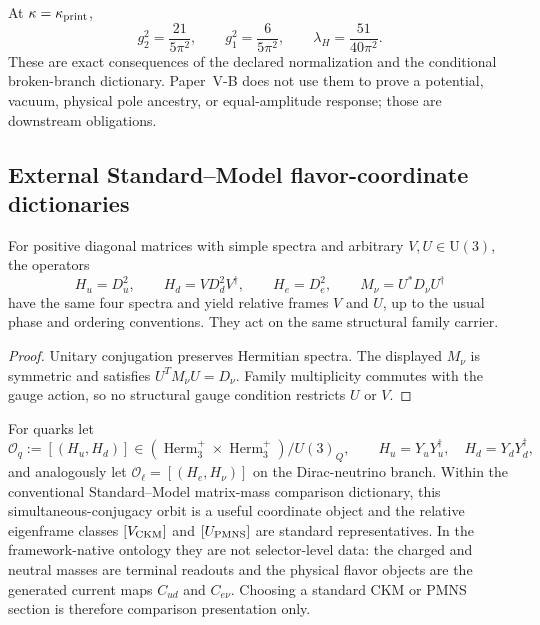 \documentclass[11pt,a4paper]{article}
\newcommand{\UU}{\mathrm U}
\begin{document}
\begin{corollary}
\label{p6:cor:printed-scalar-coordinate}
At \(\kappa=\kappa_{\rm print}\),
\[
g_2^2=\frac{21}{5\pi^2},
\qquad
g_1^2=\frac{6}{5\pi^2},
\qquad
\lambda_H=\frac{51}{40\pi^2}.
\]
These are exact consequences of the declared normalization and the
conditional broken-branch dictionary.  Paper~V-B does not use them to prove a
potential, vacuum, physical pole ancestry, or equal-amplitude response; those
are downstream obligations.
\end{corollary}

\subsection{External Standard--Model flavor-coordinate dictionaries}
\label{p6:sec:flavor-operators}

\begin{theorem}
\label{p6:thm:eigenframe-counterfamily}
For positive diagonal matrices with simple spectra and arbitrary
\(V,U\in\UU(3)\), the operators
\[
H_u=D_u^2,\qquad
H_d=VD_d^2V^\dagger,\qquad
H_e=D_e^2,\qquad
M_\nu=U^*D_\nu U^\dagger
\]
have the same four spectra and yield relative frames \(V\) and \(U\), up to
the usual phase and ordering conventions.  They act on the same structural
family carrier.
\end{theorem}

\begin{proof}
Unitary conjugation preserves Hermitian spectra.  The displayed
\(M_\nu\) is symmetric and satisfies \(U^TM_\nu U=D_\nu\).  Family
multiplicity commutes with the gauge action, so no structural gauge condition
restricts \(U\) or \(V\).
\end{proof}

\begin{definition}
\label{p6:def:relative-eigenframe-data}
For quarks let
\[
 \mathcal O_q:=[(H_u,H_d)]\in
 (\operatorname{Herm}_3^+\times\operatorname{Herm}_3^+)/U(3)_Q,
 \qquad H_u=Y_uY_u^\dagger,\quad H_d=Y_dY_d^\dagger,
\]
and analogously let
\(\mathcal O_\ell=[(H_e,H_\nu)]\) on the Dirac-neutrino branch.
Within the conventional Standard--Model matrix-mass comparison dictionary,
this simultaneous-conjugacy orbit is a useful coordinate object and the
relative eigenframe classes \([V_{\rm CKM}]\) and \([U_{\rm PMNS}]\) are
standard representatives.  In the framework-native ontology they are not
selector-level data: the charged and neutral masses are terminal readouts and
the physical flavor objects are the generated current maps \(C_{ud}\) and
\(C_{e\nu}\).  Choosing a standard CKM or PMNS section is therefore comparison
presentation only.
\end{definition}
\end{document}
